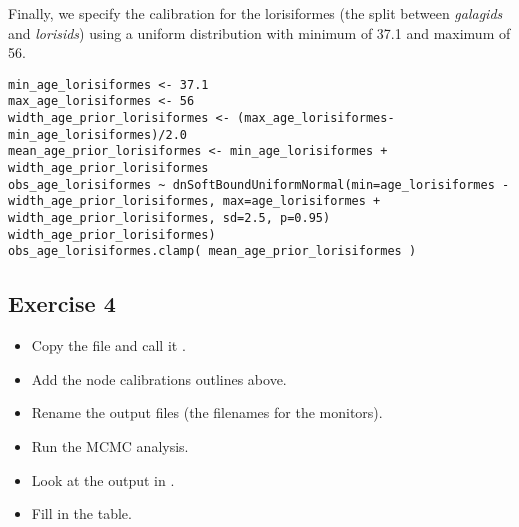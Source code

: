 Finally, we specify the calibration for the lorisiformes (the split between \emph{galagids} and \emph{lorisids}) using a uniform distribution with minimum of 37.1 and maximum of 56.
{\tt \begin{snugshade*}
\begin{lstlisting}
min_age_lorisiformes <- 37.1
max_age_lorisiformes <- 56
width_age_prior_lorisiformes <- (max_age_lorisiformes-min_age_lorisiformes)/2.0
mean_age_prior_lorisiformes <- min_age_lorisiformes + width_age_prior_lorisiformes
obs_age_lorisiformes ~ dnSoftBoundUniformNormal(min=age_lorisiformes - width_age_prior_lorisiformes, max=age_lorisiformes + width_age_prior_lorisiformes, sd=2.5, p=0.95)
width_age_prior_lorisiformes)
obs_age_lorisiformes.clamp( mean_age_prior_lorisiformes )
\end{lstlisting}
\end{snugshade*}}


\subsection{Exercise 4}

\begin{itemize}
\item Copy the file  and call it .
\item Add the node calibrations outlines above.
\item Rename the output files (\IE the filenames for the monitors).
\item Run the MCMC analysis.
\item Look at the output in \Tracer.
\item Fill in the table.
\end{itemize}




